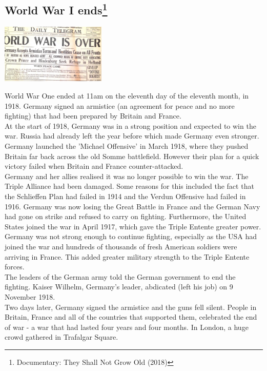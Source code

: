 \documentclass[11pt]{report}
\begin{document}
\subsection{World War I ends\protect\footnote{Documentary: They Shall Not Grow Old (2018)}}
\vspace{2mm}\begin{center}\includegraphics[width=5cm]{./img/ww1Over.jpg}\end{center}
World War One ended at 11am on the eleventh day of the eleventh month, in 1918. Germany signed an armistice (an agreement for peace and no more fighting) that had been prepared by Britain and France.\\ \indent At the start of 1918, Germany was in a strong position and expected to win the war. Russia had already left the year before which made Germany even stronger.
Germany launched the 'Michael Offensive' in March 1918, where they pushed Britain far back across the old Somme battlefield. However their plan for a quick victory failed when Britain and France counter-attacked.\\ \indent Germany and her allies realised it was no longer possible to win the war. The Triple Alliance had been damaged. Some reasons for this included the fact that the Schlieffen Plan had failed in 1914 and the Verdun Offensive had failed in 1916. Germany was now losing the Great Battle in France and the German Navy had gone on strike and refused to carry on fighting. Furthermore, the United States joined the war in April 1917, which gave the Triple Entente greater power.\\
Germany was not strong enough to continue fighting, especially as the USA had joined the war and hundreds of thousands of fresh American soldiers were arriving in France. This added greater military strength to the Triple Entente forces.\\ \indent The leaders of the German army told the German government to end the fighting. Kaiser Wilhelm, Germany's leader, abdicated (left his job) on 9 November 1918.\\ \indent Two days later, Germany signed the armistice and the guns fell silent. People in Britain, France and all of the countries that supported them, celebrated the end of war - a war that had lasted four years and four months. In London, a huge crowd gathered in Trafalgar Square.
\end{document}
